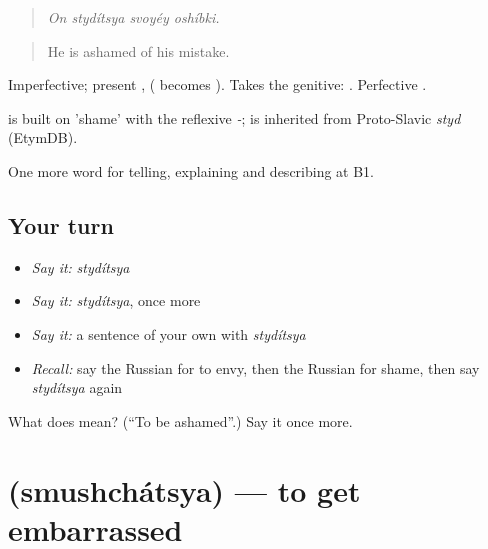 \begin{quote}
\emph{On stydítsya svoyéy oshíbki.}
\end{quote}

\begin{quote}
He is ashamed of his mistake.
\end{quote}

Imperfective; present ,  ( becomes ). Takes the genitive: \emph{ }. Perfective .

\begin{cousinweb}
\emph{} is built on \emph{} 'shame' with the reflexive \emph{-}; \emph{} is inherited from Proto-Slavic \emph{styd} (EtymDB).
\end{cousinweb}

\begin{grammarlens}[title={What you've built}]
One more word for telling, explaining and describing at B1.
\end{grammarlens}

\subsection*{Your turn}
\begin{itemize}
\raggedright
  \item \emph{Say it:} \emph{stydítsya}
  \item \emph{Say it:} \emph{stydítsya}, once more
  \item \emph{Say it:} a sentence of your own with \emph{stydítsya}
  \item \emph{Recall:} say the Russian for to envy, then the Russian for shame, then say \emph{stydítsya} again
\end{itemize}

\begin{tcolorbox}[breakable,colback=teal!4,colframe=teal!35!black,title={Before you move on}]
What does  mean? (\textquotedblleft{}To be ashamed\textquotedblright{}.) Say it once more.
\end{tcolorbox}
\section[\texorpdfstring{\ru{смущаться} (smushchátsya)}{смущаться (smushchátsya)}]{ (smushchátsya) — to get embarrassed}

\label{lesson:RU-C470-smushchatsya}



